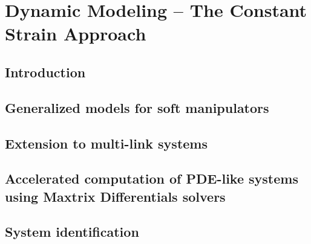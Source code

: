 \chapter[Dynamic modeling of Soft Robots -- PCC case]{Dynamic Modeling -- The  Constant Strain Approach}
\label{chap: chapter 1}



\ifx\printChapterOne\undefined
\else

\section{Introduction}
\label{sec: chap1 1_introduction}


\cleardoublepage
\section{Generalized models for soft manipulators}
\label{sec: chap2 section header}


\section{Extension to multi-link systems}
\label{sec: chap2 section header}


\clearpage
\section[Accelerated computation of PDE-like systems]{Accelerated computation of PDE-like systems using Maxtrix Differentials solvers}
\label{sec: chap2 section header}


\clearpage
\section{System identification}
\label{sec: chap2 section header}


